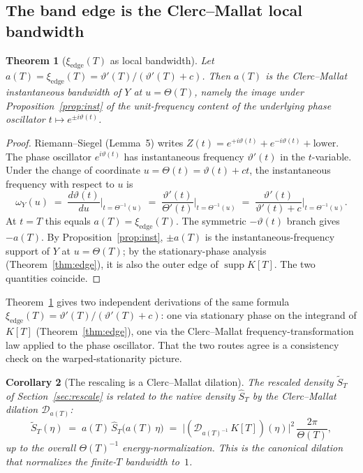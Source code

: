 \documentclass[11pt,a4paper]{article}
\theoremstyle{plain}
\newtheorem{theorem}{Theorem}
\newtheorem{corollary}[theorem]{Corollary}
\theoremstyle{definition}
\DeclareMathOperator{\supp}{supp}
\begin{document}
\subsection{The band edge is the Clerc--Mallat local bandwidth}

\begin{theorem}[$\xi_{\mathrm{edge}}(T)$ as local bandwidth]\label{thm:CMedge}
Let $a(T)=\xi_{\mathrm{edge}}(T)=\vartheta'(T)/(\vartheta'(T)+c)$. Then $a(T)$ is the Clerc--Mallat instantaneous bandwidth of $Y$ at $u=\Theta(T)$, namely the image under Proposition~\ref{prop:inst} of the unit-frequency content of the underlying phase oscillator $t\mapsto e^{\pm i\vartheta(t)}$.
\end{theorem}

\begin{proof}
Riemann--Siegel (Lemma~5) writes $Z(t)=e^{+i\vartheta(t)}+e^{-i\vartheta(t)}+\text{lower}$. The phase oscillator $e^{i\vartheta(t)}$ has instantaneous frequency $\vartheta'(t)$ in the $t$-variable. Under the change of coordinate $u=\Theta(t)=\vartheta(t)+ct$, the instantaneous frequency with respect to $u$ is
\[
\omega_Y(u) \;=\; \frac{d\vartheta(t)}{du}\bigg|_{t=\Theta^{-1}(u)} \;=\; \frac{\vartheta'(t)}{\Theta'(t)}\bigg|_{t=\Theta^{-1}(u)} \;=\; \frac{\vartheta'(t)}{\vartheta'(t)+c}\bigg|_{t=\Theta^{-1}(u)} .
\]
At $t=T$ this equals $a(T)=\xi_{\mathrm{edge}}(T)$. The symmetric $-\vartheta(t)$ branch gives $-a(T)$. By Proposition~\ref{prop:inst}, $\pm a(T)$ is the instantaneous-frequency support of $Y$ at $u=\Theta(T)$; by the stationary-phase analysis (Theorem~\ref{thm:edge}), it is also the outer edge of $\supp K[T]$. The two quantities coincide.
\end{proof}

\begin{remark}
Theorem~\ref{thm:CMedge} gives two independent derivations of the same formula $\xi_{\mathrm{edge}}(T)=\vartheta'(T)/(\vartheta'(T)+c)$: one via stationary phase on the integrand of $K[T]$ (Theorem~\ref{thm:edge}), one via the Clerc--Mallat frequency-transformation law applied to the phase oscillator. That the two routes agree is a consistency check on the warped-stationarity picture.
\end{remark}

\begin{corollary}[The rescaling is a Clerc--Mallat dilation]\label{cor:rescaleCM}
The rescaled density $\widetilde S_T$ of Section~\ref{sec:rescale} is related to the native density $\widehat S_T$ by the Clerc--Mallat dilation $\mathcal{D}_{a(T)}$:
\[
\widetilde{S}_T(\eta) \;=\; a(T)\,\widehat{S}_T\bigl(a(T)\,\eta\bigr) \;=\; \bigl|(\mathcal{D}_{a(T)^{-1}}\,K[T])(\eta)\bigr|^2\,\frac{2\pi}{\Theta(T)},
\]
up to the overall $\Theta(T)^{-1}$ energy-normalization. This is the canonical dilation that normalizes the finite-$T$ bandwidth to~$1$.
\end{corollary}
\end{document}
